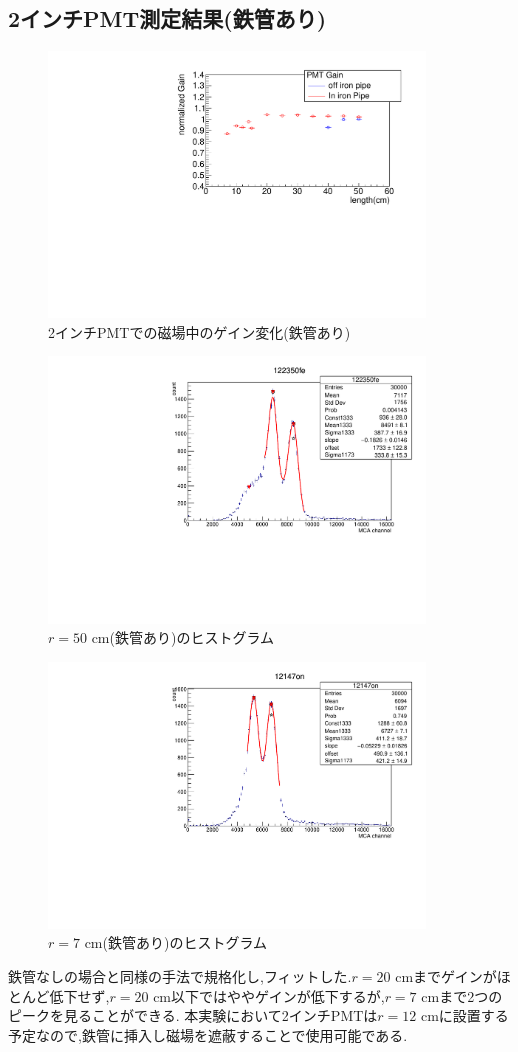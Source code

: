 \subsection{2インチPMT測定結果(鉄管あり)}
\begin{figure}[H]
	\centering
		\includegraphics[angle=-90,width=10cm]{fig/iguchi/bigPMTfit.pdf}
	\caption{2インチPMTでの磁場中のゲイン変化(鉄管あり)}
	\label{bigPMTfit}
\end{figure}
\begin{figure}[H]
	\centering
		\includegraphics[angle=-90,width=10cm]{fig/iguchi/122350fe.pdf}
	\caption{$r=50$ cm(鉄管あり)のヒストグラム}
	\label{hist50fe}
\end{figure}
\begin{figure}[H]
	\centering
		\includegraphics[angle=-90,width=10cm]{fig/iguchi/12147on.pdf}
	\caption{$r=7$ cm(鉄管あり)のヒストグラム}
	\label{hist7fe}
\end{figure}
鉄管なしの場合と同様の手法で規格化し,フィットした.$r=20$ cmまでゲインがほとんど低下せず,$r=20$ cm以下ではややゲインが低下するが,$r=7$ cmまで2つのピークを見ることができる.
本実験において2インチPMTは$r=12$ cmに設置する予定なので,鉄管に挿入し磁場を遮蔽することで使用可能である.

